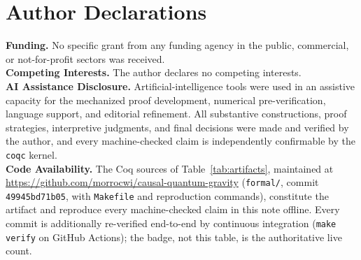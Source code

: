\documentclass[10pt,twocolumn]{article}
\theoremstyle{definition}
\newcommand{\code}[1]{\texttt{#1}}
\begin{document}
\section*{Author Declarations}
\textbf{Funding.} No specific grant from any funding agency in the public,
commercial, or not-for-profit sectors was received.\\[0.25em]
\textbf{Competing Interests.} The author declares no competing interests.\\[0.25em]
\textbf{AI Assistance Disclosure.} Artificial-intelligence tools were used in an
assistive capacity for the mechanized proof development, numerical pre-verification,
language support, and editorial refinement. All substantive constructions, proof
strategies, interpretive judgments, and final decisions were made and verified by the
author, and every machine-checked claim is independently confirmable by the
\code{coqc} kernel.\\[0.25em]
\textbf{Code Availability.} The Coq sources of Table~\ref{tab:artifacts},
maintained at \url{https://github.com/morrocwi/causal-quantum-gravity}
(\code{formal/}, commit \code{49945bd71b05}, with \code{Makefile} and reproduction
commands), constitute the
artifact and reproduce every machine-checked claim in this note offline. Every
commit is additionally re-verified end-to-end by continuous integration
(\code{make verify} on GitHub Actions); the badge, not this table, is the
authoritative live count.
\end{document}
